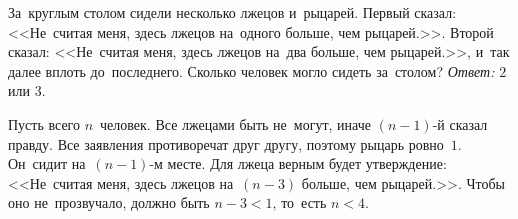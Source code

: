 \problem
За~круглым столом сидели несколько лжецов и~рыцарей.
Первый сказал: <<Не~считая меня, здесь лжецов на~одного больше, чем рыцарей.>>.
Второй сказал: <<Не~считая меня, здесь лжецов на~два больше, чем рыцарей.>>,
и~так далее вплоть до~последнего.
Сколько человек могло сидеть за~столом?
\solution
\emph{Ответ:} $2$ или $3$.
\par
Пусть всего $n$~человек.
Все лжецами быть не~могут, иначе $(n - 1)$-й сказал правду.
Все заявления противоречат друг другу, поэтому рыцарь ровно~$1$.
Он~сидит на~$(n - 1)$-м  месте.
Для лжеца верным будет утверждение: <<Не~считая меня, здесь лжецов на~$(n - 3)$ больше, чем рыцарей.>>.
Чтобы оно не~прозвучало, должно быть $n - 3 < 1$, то~есть $n < 4$.
\endproblem
